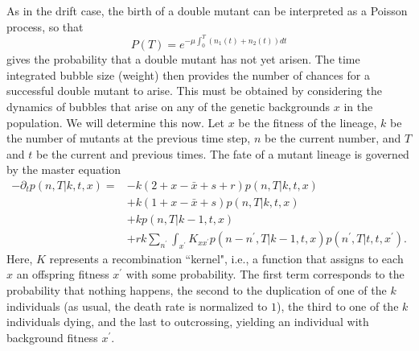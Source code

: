 \documentclass[10pt]{revtex4}
\begin{document}
As in the drift case, the birth of a double mutant can be interpreted as a Poisson process, so that
\begin{equation}
P(T) = e^{-\mu \int_0^T (n_1(t) + n_2(t)) dt}
\end{equation}
gives the probability that a double mutant has not yet arisen.
The time integrated bubble size (weight) then provides the number of chances for a successful double mutant to arise.
This must be obtained by considering the dynamics of bubbles that arise on any of the genetic backgrounds $x$ in the population.
We will determine this now.
Let $x$ be the fitness of the lineage, $k$ be the number of mutants at the previous time step, $n$ be the current number, and $T$ and $t$ be the current and previous times.
The fate of a mutant lineage is governed by the master equation
\begin{align*}
-\partial_t p(n,T|k,t,x) = &-k(2+x-\bar{x}+s+r)p(n,T|k,t,x) \\
& + k(1+x-\bar{x}+s)p(n,T|k,t,x) \\
& +kp(n,T|k-1,t,x) \\
&+rk\sum_{n^\prime} \int_{x^\prime} K_{x x^\prime} p(n-n^\prime , T|k-1, t, x) p(n^\prime,T|t,t,x^\prime).
\end{align*}
Here, $K$ represents a recombination ``kernel", i.e., a function that assigns to each $x$ an offspring fitness $x^\prime$ with some probability.
The first term corresponds to the probability that nothing happens, the second to the duplication of one of the $k$ individuals (as usual, the death rate is normalized to $1$), the third to one of the $k$ individuals dying, and the last to outcrossing, yielding an individual with background fitness $x^\prime$.
\end{document}
